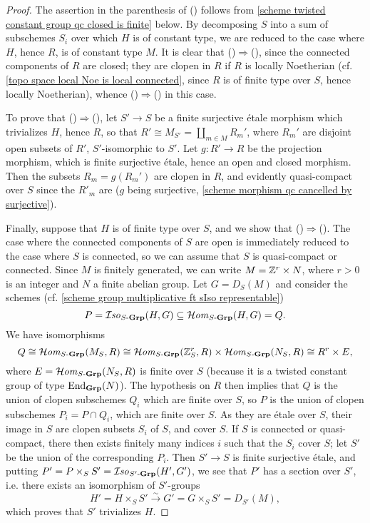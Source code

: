 \begin{proof}
The assertion in the parenthesis of () follows from \cref{scheme twisted constant group qc closed is finite} below. By decomposing $S$ into a sum of subschemes $S_i$ over which $H$ is of constant type, we are reduced to the case where $H$, hence $R$, is of constant type $M$. It is clear that ()$\Rightarrow$(), since the connected components of $R$ are closed; they are clopen in $R$ if $R$ is locally Noetherian (cf. \cref{topo space local Noe is local connected}, since $R$ is of finite type over $S$, hence locally Noetherian), whence ()$\Rightarrow$() in this case.\par
To prove that ()$\Rightarrow$(), let $S'\to S$ be a finite surjective \'etale morphism which trivializes $H$, hence $R$, so that $R'\cong M_{S'}=\coprod_{m\in M}R_m'$, where $R_m'$ are disjoint open subsets of $R'$, $S'$-isomorphic to $S'$. Let $g:R'\to R$ be the projection morphism, which is finite surjective \'etale, hence an open and closed morphism. Then the subsets $R_m=g(R_m')$ are clopen in $R$, and evidently quasi-compact over $S$ since the $R'_m$ are ($g$ being surjective, \cref{scheme morphism qc cancelled by surjective}).\par
Finally, suppose that $H$ is of finite type over $S$, and we show that ()$\Rightarrow$(). The case where the connected components of $S$ are open is immediately reduced to the case where $S$ is connected, so we can assume that $S$ is quasi-compact or connected. Since $M$ is finitely generated, we can write $M=\mathbb{Z}^r\times N$, where $r>0$ is an integer and $N$ a finite abelian group. Let $G=D_S(M)$ and consider the schemes (cf. \cref{scheme group multiplicative ft sIso representable})
\[P=\operatorname{\mathcal{I}\hspace*{-0.5pt}\textit{so}\hspace{0.5pt}}_{S\textup{-}\mathbf{Grp}}(H,G)\subseteq\operatorname{\mathcal{H}\hspace*{-0.4pt}\textit{om}\hspace{0.5pt}}_{S\textup{-}\mathbf{Grp}}(H,G)=Q.\]
We have isomorphisms
\[Q\cong\operatorname{\mathcal{H}\hspace*{-0.4pt}\textit{om}\hspace{0.5pt}}_{S\textup{-}\mathbf{Grp}}(M_S,R)\cong\operatorname{\mathcal{H}\hspace*{-0.4pt}\textit{om}\hspace{0.5pt}}_{S\textup{-}\mathbf{Grp}}(\mathbb{Z}_S^r,R)\times\operatorname{\mathcal{H}\hspace*{-0.4pt}\textit{om}\hspace{0.5pt}}_{S\textup{-}\mathbf{Grp}}(N_S,R)\cong R^r\times E,\]
where $E=\operatorname{\mathcal{H}\hspace*{-0.4pt}\textit{om}\hspace{0.5pt}}_{S\textup{-}\mathbf{Grp}}(N_S,R)$ is finite over $S$ (because it is a twisted constant group of type $\mathrm{End}_{\mathbf{Grp}}(N)$). The hypothesis on $R$ then implies that $Q$ is the union of clopen subschemes $Q_i$ which are finite over $S$, so $P$ is the union of clopen subschemes $P_i=P\cap Q_i$, which are finite over $S$. As they are \'etale over $S$, their image in $S$ are clopen subsets $S_i$ of $S$, and cover $S$. If $S$ is connected or quasi-compact, there then exists finitely many indices $i$ such that the $S_i$ cover $S$; let $S'$ be the union of the corresponding $P_i$. Then $S'\to S$ is finite surjective \'etale, and putting $P'=P\times_SS'=\operatorname{\mathcal{I}\hspace*{-0.5pt}\textit{so}\hspace{0.5pt}}_{S'\textup{-}\mathbf{Grp}}(H',G')$, we see that $P'$ has a section over $S'$, i.e. there exists an isomorphism of $S'$-groups
\[H'=H\times_SS'\stackrel{\sim}{\to} G'=G\times_SS'=D_{S'}(M),\]
which proves that $S'$ trivializes $H$. 
\end{proof}


